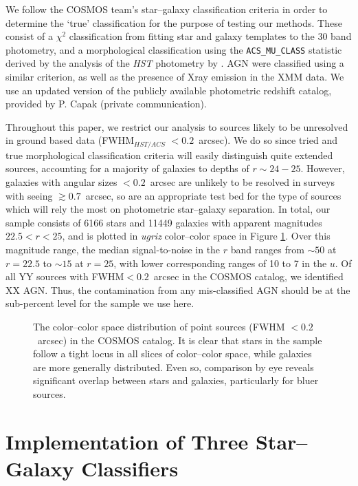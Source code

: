 \documentclass[12pt,preprint]{aastex}
\begin{document}
We follow the COSMOS team's star--galaxy classification criteria 
in order to determine the `true' classification for the purpose of 
testing our methods.  These consist of a $\chi^2$ classification 
from fitting star and galaxy templates to the 30 band photometry, 
and a morphological classification using the 
{\tt ACS\_MU\_CLASS} statistic derived by the analysis of the 
\textit{HST} photometry by \citet{scarlata07}.  AGN were classified 
using a similar criterion, as well as the presence of Xray emission 
in the {XMM} data.  We use an updated version of the publicly 
available photometric redshift catalog, provided by P. Capak 
(private communication).  

Throughout this paper, we restrict our analysis to sources likely to
be unresolved in ground based data (FWHM$_{HST/ACS}$ $< 0.2$~arcsec).  We
do so since tried and true morphological classification criteria will
easily distinguish quite extended sources, accounting for a majority
of galaxies to depths of $r\sim24-25$.  However, galaxies with angular
sizes $< 0.2$~arcsec are unlikely to be resolved in surveys with seeing
$\gtrsim0.7$~arcsec, so are an appropriate test bed for the type of sources
which will rely the most on photometric star--galaxy separation.  In
total, our sample consists of 6166 stars and 11449 galaxies with apparent 
magnitudes $22.5<r<25$, and is plotted in {\it ugriz} color--color space in
Figure \ref{fig:color-color-data}.   Over this magnitude range, the median 
signal-to-noise in the $r$ band ranges from $\sim50$ at $r=22.5$ to 
$\sim15$ at $r=25$, with lower corresponding ranges of 10 to 7 in the $u$.  
Of all YY sources with FWHM$<0.2$~arcsec in the COSMOS catalog, we 
identified XX AGN.  Thus, the contamination from any mis-classified AGN 
should be at the sub-percent level for the sample we use here.

\begin{figure}
\centering
\caption{The color--color space distribution of point sources (FWHM $<
  0.2$~arcsec) in the COSMOS catalog.  It is clear that stars in the sample
  follow a tight locus in all slices of color--color space, while
  galaxies are more generally distributed.  Even so, comparison by eye
  reveals significant overlap between stars and galaxies, particularly
  for bluer sources.}
\label{fig:color-color-data}
\end{figure}


\section{Implementation of Three Star--Galaxy Classifiers}
\label{sec:specifics}
\end{document}
